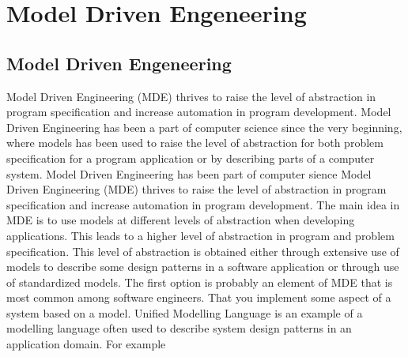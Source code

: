 
\chapter{Model Driven Engeneering} %

\label{Chapter2} %



\section{Model Driven Engeneering}

Model Driven Engineering (MDE)\cite{France2007} thrives to raise the level of
abstraction in program specification and increase automation in program development.
Model Driven Engineering has been a part of computer science since the very
beginning, where models has been used to raise the level of abstraction for both
problem specification for a program application or by describing parts of a
computer system.
Model Driven Engineering has been part of computer sience Model Driven
Engineering (MDE)\cite{France2007} thrives to raise the level of abstraction in
program specification and increase automation in program development. The main
idea in MDE is to use models at different levels of abstraction when developing
applications. This leads to a higher level of abstraction in program and
problem specification. This level of abstraction is obtained either through
extensive use of models to describe some design patterns in a software
application or through use of standardized models. The first option is probably
an element of MDE that is most common among software engineers. That you
implement some aspect of a system based on a model. Unified Modelling
Language\cite{UML} is an example of a modelling language often used to describe
system design patterns in an application domain. For example 

